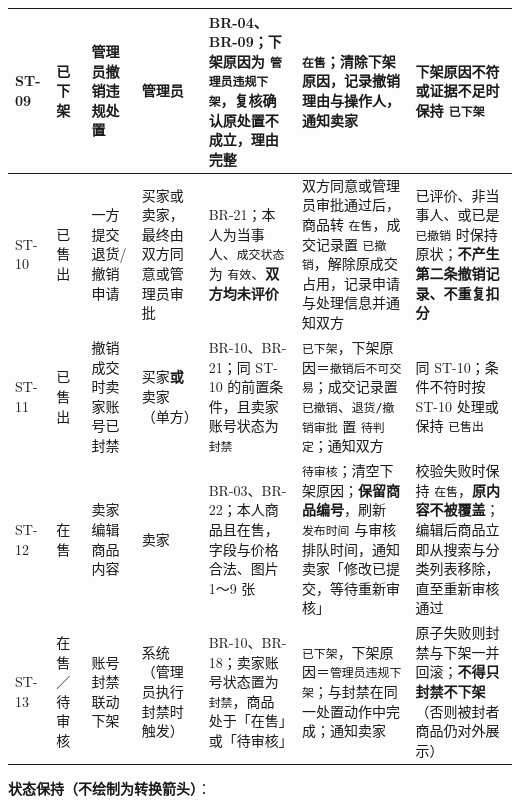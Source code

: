 \documentclass[12pt,a4paper]{ctexart}
\begin{document}
{\begin{longtable}{|p{1.38cm}|p{1.38cm}|p{1.38cm}|p{1.71cm}|p{3.46cm}|p{3.53cm}|p{3.16cm}|}
\hline
ST-09 & 已下架 & 管理员撤销违规处置 & 管理员 & BR-04、BR-09；下架原因为 \texttt{管理员违规下架}，复核确认原处置不成立，理由完整 & \texttt{在售}；清除下架原因，记录撤销理由与操作人，通知卖家 & 下架原因不符或证据不足时保持 \texttt{已下架} \\
\hline
ST-10 & 已售出 & 一方提交退货/撤销申请 & 买家或卖家，最终由双方同意或管理员审批 & BR-21；本人为当事人、\texttt{成交状态} 为 \texttt{有效}、\textbf{双方均未评价} & 双方同意或管理员审批通过后，商品转 \texttt{在售}，成交记录置 \texttt{已撤销}，解除原成交占用，记录申请与处理信息并通知双方 & 已评价、非当事人、或已是 \texttt{已撤销} 时保持原状；\textbf{不产生第二条撤销记录、不重复扣分} \\
\hline
ST-11 & 已售出 & 撤销成交时卖家账号已封禁 & 买家\textbf{或}卖家（单方） & BR-10、BR-21；同 ST-10 的前置条件，且卖家账号状态为 \texttt{封禁} & \texttt{已下架}，下架原因＝\texttt{撤销后不可交易}；成交记录置 \texttt{已撤销}、\texttt{退货/撤销审批} 置 \texttt{待判定}；通知双方 & 同 ST-10；条件不符时按 ST-10 处理或保持 \texttt{已售出} \\
\hline
ST-12 & 在售 & 卖家编辑商品内容 & 卖家 & BR-03、BR-22；本人商品且在售，字段与价格合法、图片 1～9 张 & \texttt{待审核}；清空下架原因；\textbf{保留商品编号}，刷新 \texttt{发布时间} 与审核排队时间，通知卖家「修改已提交，等待重新审核」 & 校验失败时保持 \texttt{在售}，\textbf{原内容不被覆盖}；编辑后商品立即从搜索与分类列表移除，直至重新审核通过 \\
\hline
ST-13 & 在售／待审核 & 账号封禁联动下架 & 系统（管理员执行封禁时触发） & BR-10、BR-18；卖家账号状态置为 \texttt{封禁}，商品处于「在售」或「待审核」 & \texttt{已下架}，下架原因＝\texttt{管理员违规下架}；与封禁在同一处置动作中完成；通知卖家 & 原子失败则封禁与下架一并回滚；\textbf{不得只封禁不下架}（否则被封者商品仍对外展示） \\
\hline
\end{longtable}
}


\textbf{状态保持（不绘制为转换箭头）}：
\end{document}

